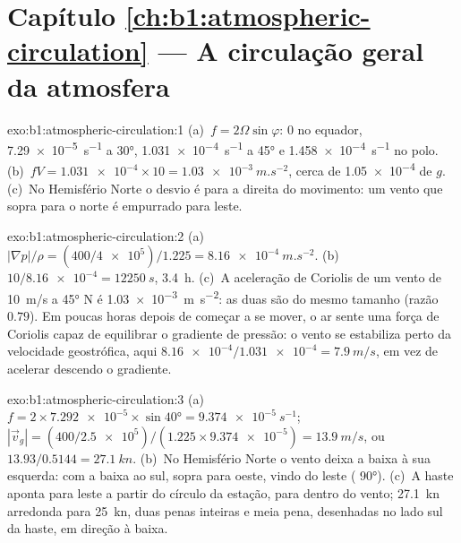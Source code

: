 \section*{Capítulo \ref{ch:b1:atmospheric-circulation} --- A circulação geral da atmosfera}

\begin{solution}{exo:b1:atmospheric-circulation:1}
(a)~$f = 2\Omega\sin\varphi$: $0$ no equador, \qty{7.29e-5}{s^{-1}} a \ang{30},
\qty{1.031e-4}{s^{-1}} a \ang{45} e \qty{1.458e-4}{s^{-1}} no polo. (b)~$fV = \num{1.031e-4} \times 10 = \qty{1.03e-3}{m.s^{-2}}$, cerca de \num{1.05e-4} de $g$. (c)~No Hemisfério Norte o desvio é para a
direita do movimento: um vento que sopra para o norte é empurrado para leste.
\end{solution}

\begin{solution}{exo:b1:atmospheric-circulation:2}
(a)~$|\nabla p|/\rho = (400/\num{4e5})/1.225 = \qty{8.16e-4}{m.s^{-2}}$.
(b)~$10/\num{8.16e-4} = \qty{12250}{s}$, \qty{3.4}{h}. (c)~A aceleração de Coriolis de um vento de
\qty{10}{m/s} a \ang{45} N é \qty{1.03e-3}{m.s^{-2}}: as duas são do mesmo tamanho (razão $0.79$).
Em poucas horas depois de começar a se mover, o ar sente uma força de Coriolis capaz de equilibrar o
gradiente de pressão: o vento se estabiliza perto da velocidade geostrófica, aqui $\num{8.16e-4}/\num{1.031e-4} = \qty{7.9}{m/s}$,
em vez de acelerar descendo o gradiente.
\end{solution}

\begin{solution}{exo:b1:atmospheric-circulation:3}
(a)~$f = 2 \times \num{7.292e-5} \times \sin\ang{40} = \qty{9.374e-5}{s^{-1}}$;
$|\vec v_g| = (400/\num{2.5e5})/(1.225 \times \num{9.374e-5}) = \qty{13.9}{m/s}$, ou
$13.93/0.5144 = \qty{27.1}{kn}$. (b)~No Hemisfério Norte o vento deixa a baixa à sua esquerda: com a
baixa ao sul, sopra para oeste, vindo do leste ( \ang{90}). (c)~A haste aponta para leste a
partir do círculo da estação, para dentro do vento; \qty{27.1}{kn} arredonda para \qty{25}{kn}, duas
penas inteiras e meia pena, desenhadas no lado sul da haste, em direção à baixa.
\end{solution}

